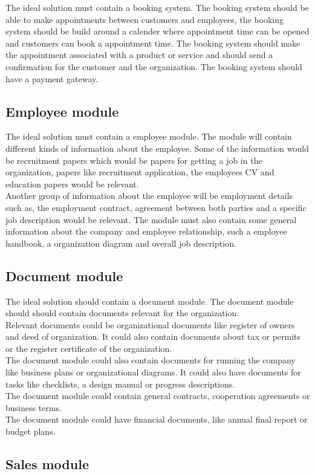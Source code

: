 The ideal solution must contain a booking system. The booking system should be able to make appointments between customers and employees, the booking system should be build around a calender where appointment time can be opened and customers can book a appointment time. The booking system should make the appointment associated with a product or service and should send a confirmation for the customer and the organization. The booking system should have a payment gateway.

\subsection{Employee module}
The ideal solution must contain a employee module. The module will contain different kinds of information about the employee. Some of the information would be recruitment papers which would be papers for getting a job in the organization, papers like recruitment application, the employees CV and education papers would be relevant. \\
Another group of information about the employee will be employment details such as, the employment contract, agreement between both parties and a specific job description would be relevant. The module must also contain some general information about the company and employee relationship, such a employee handbook, a organization diagram and overall job description.

\subsection{Document module}
The ideal solution should contain a document module. The document module should should contain documents relevant for the organization.\\
Relevant documents could be organizational documents like register of owners and deed of organization. It could also contain documents about tax or permits or the register certificate of the organization.\\
The document module could also contain documents for running the company like business plans or organizational diagrams. It could also have documents for tasks like checklists, a design manual or progress descriptions.\\
The document module could contain general contracts, cooperation agreements or business terms.\\
The document module could have financial documents, like annual final report or budget plans.

\subsection{Sales module}